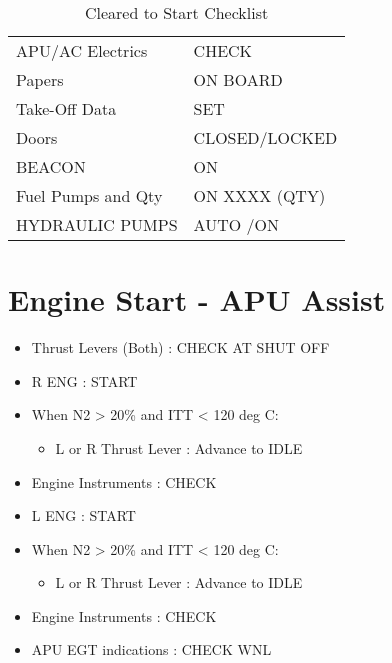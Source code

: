 \begin{table}[htbp]
\begin{minipage}{\linewidth}
\setlength{\tymax}{0.5\linewidth}
\centering
\small
\caption{Cleared to Start Checklist}
\label{clearedtostartchecklist}
\begin{tabulary}{\textwidth}{@{}ll@{}} \toprule
\midrule

 APU\slash AC Electrics  & CHECK      \\
 Papers    & ON BOARD      \\
 Take-Off Data  & SET       \\
 Doors    & CLOSED\slash LOCKED    \\
 BEACON    & ON       \\
 Fuel Pumps and Qty & ON XXXX (QTY)    \\
 HYDRAULIC PUMPS  & AUTO \slash  ON     \\
\bottomrule

\end{tabulary}
\end{minipage}
\end{table}

\section{Engine Start - APU Assist}
\label{enginestart-apuassist}

\begin{itemize}
\item Thrust Levers (Both) : CHECK AT SHUT OFF

\item R ENG : START

\item When N2 > 20\% and ITT < 120 deg C:

\begin{itemize}
\item L or R Thrust Lever : Advance to IDLE

\end{itemize}

\item Engine Instruments : CHECK

\item L ENG : START

\item When N2 > 20\% and ITT < 120 deg C:

\begin{itemize}
\item L or R Thrust Lever : Advance to IDLE

\end{itemize}

\item Engine Instruments : CHECK

\item APU EGT indications : CHECK WNL

\end{itemize}

